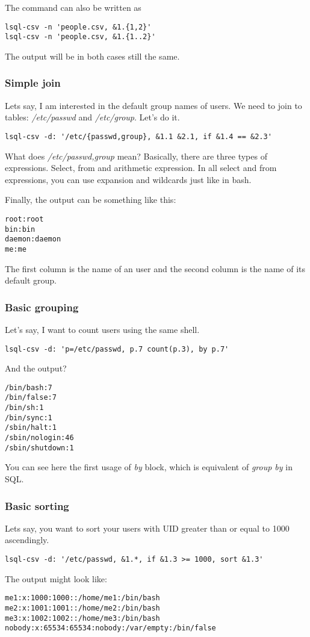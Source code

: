 The command can also be written as
\begin{verbatim}
lsql-csv -n 'people.csv, &1.{1,2}'
lsql-csv -n 'people.csv, &1.{1..2}'
\end{verbatim}
The output will be in both cases still the same.


\subsubsection{Simple join}
Lets say, I am interested in the default group names of users. We need to join to tables: \textit{/etc/passwd} and \textit{/etc/group}. Let's do it.
\begin{verbatim}
lsql-csv -d: '/etc/{passwd,group}, &1.1 &2.1, if &1.4 == &2.3'
\end{verbatim}
What does \textit{/etc/{passwd,group}} mean? Basically, there are three types of expressions. Select, from and arithmetic expression. In all select and from expressions, you can use expansion and wildcards just like in bash\cite{bash-reference-manual}.

Finally, the output can be something like this:
\begin{verbatim}
root:root
bin:bin
daemon:daemon
me:me
\end{verbatim}
The first column is the name of an user and the second column is the name of its default group.


\subsubsection{Basic grouping}
Let's say, I want to count users using the same shell.
\begin{verbatim}
lsql-csv -d: 'p=/etc/passwd, p.7 count(p.3), by p.7'
\end{verbatim}
And the output?
\begin{verbatim}
/bin/bash:7
/bin/false:7
/bin/sh:1
/bin/sync:1
/sbin/halt:1
/sbin/nologin:46
/sbin/shutdown:1
\end{verbatim}

You can see here the first usage of \textit{by} block, which is equivalent of \textit{group by} in SQL.

\subsubsection{Basic sorting}
Lets say, you want to sort your users with UID greater than or equal to 1000 ascendingly.
\begin{verbatim}
lsql-csv -d: '/etc/passwd, &1.*, if &1.3 >= 1000, sort &1.3'
\end{verbatim}
The output might look like:
\begin{verbatim}
me1:x:1000:1000::/home/me1:/bin/bash
me2:x:1001:1001::/home/me2:/bin/bash
me3:x:1002:1002::/home/me3:/bin/bash
nobody:x:65534:65534:nobody:/var/empty:/bin/false
\end{verbatim}

